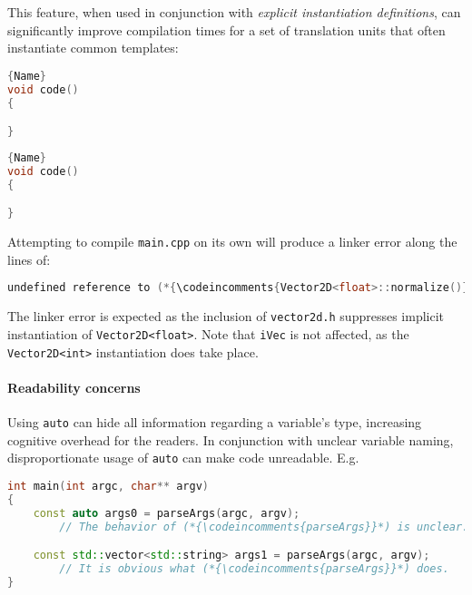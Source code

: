\documentclass[twoside,10pt,letterpaper,usenames]{newstyle-PearsonGeneric-7-38}
\newcommand{\codeincomments}{\color{skyblue}\ttfamily}
\begin{document}
This feature, when used in conjunction with \emph{explicit instantiation
definitions}, can significantly improve compilation times for a set of
translation units that often instantiate common templates:

\noindent\begin{minipage}{.45\textwidth}
\begin{lstlisting}[language=C++, caption=code 1,frame=tb]{Name}
void code()
{

}
\end{lstlisting}
\end{minipage}\hfill
\begin{minipage}{.45\textwidth}
\begin{lstlisting}[language=C++, caption=code 2,frame=tb]{Name}
void code()
{

}
\end{lstlisting}
\end{minipage}

Attempting to compile \texttt{main.cpp} on its own will produce a linker
error along the lines of:

\begin{lstlisting}[language=C++]
undefined reference to (*{\codeincomments{Vector2D<float>::normalize()}}*)
\end{lstlisting}
    

The linker error is expected as the inclusion of \texttt{vector2d.h}
suppresses implicit instantiation of \texttt{Vector2D<float>}. Note that
\texttt{iVec} is not affected, as the \texttt{Vector2D<int>}
instantiation does take place.

\paragraph[Readability concerns]{Readability concerns}\label{readability-concerns}

Using \texttt{auto} can hide all information regarding a variable's
type, increasing cognitive overhead for the readers. In conjunction with
unclear variable naming, disproportionate usage of \texttt{auto} can
make code unreadable. E.g.

\begin{lstlisting}[language=C++]
int main(int argc, char** argv)
{
    const auto args0 = parseArgs(argc, argv);
        // The behavior of (*{\codeincomments{parseArgs}}*) is unclear.

    const std::vector<std::string> args1 = parseArgs(argc, argv);
        // It is obvious what (*{\codeincomments{parseArgs}}*) does.
}
\end{lstlisting}
    
\end{document}
